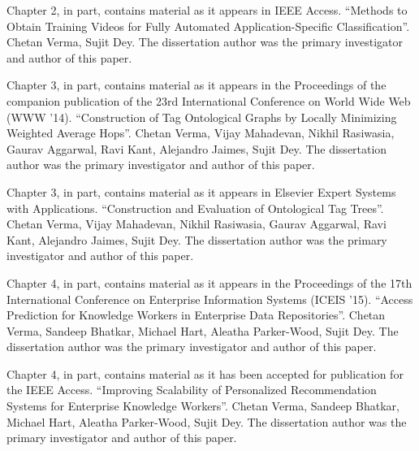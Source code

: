 \documentclass[12pt]{ucsddissertation}
\begin{document}
\begin{acknowledgements}
Chapter 2, in part, contains material as it appears in IEEE Access. ``Methods to Obtain Training Videos for Fully Automated Application-Specific Classification''. Chetan Verma, Sujit Dey. The dissertation author was the primary investigator and author of this paper. 

Chapter 3, in part, contains material as it appears in the Proceedings of the companion publication of the 23rd International Conference on World Wide Web (WWW '14). ``Construction of Tag Ontological Graphs by Locally Minimizing Weighted Average Hops''. Chetan Verma, Vijay Mahadevan, Nikhil Rasiwasia, Gaurav Aggarwal, Ravi Kant, Alejandro Jaimes, Sujit Dey. The dissertation author was the primary investigator and author of this paper. 

Chapter 3, in part, contains material as it appears in Elsevier Expert Systems with Applications. ``Construction and Evaluation of Ontological Tag Trees''. Chetan Verma, Vijay Mahadevan, Nikhil Rasiwasia, Gaurav Aggarwal, Ravi Kant, Alejandro Jaimes, Sujit Dey. The dissertation author was the primary investigator and author of this paper. 

Chapter 4, in part, contains material as it appears in the Proceedings of the 17th International Conference on Enterprise Information Systems (ICEIS '15). ``Access Prediction for Knowledge Workers in Enterprise Data Repositories''. Chetan Verma, Sandeep Bhatkar, Michael Hart, Aleatha Parker-Wood, Sujit Dey. The dissertation author was the primary investigator and author of this paper. 

Chapter 4, in part, contains material as it has been accepted for publication for the IEEE Access. ``Improving Scalability of Personalized Recommendation Systems for Enterprise Knowledge Workers''. Chetan Verma, Sandeep Bhatkar, Michael Hart, Aleatha Parker-Wood, Sujit Dey. The dissertation author was the primary investigator and author of this paper. 

\end{acknowledgements}
\end{document}
